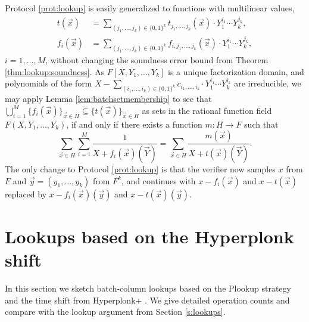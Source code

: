 \documentclass[11pt]{article}
\theoremstyle{definition}
\theoremstyle{definition}
\begin{document}
Protocol \ref{prot:lookup} is easily generalized to functions with multilinear values, 
\begin{align*}
t(\vec x) &= \sum_{(j_1,\ldots, j_k)\in\{0,1\}^k} t_{j_1,\ldots, j_k}(\vec x)\cdot Y_1^{i_1}\cdots Y_k^{j_k},
\\
f_i(\vec x) &= \sum_{(j_1,\ldots, j_k)\in\{0,1\}^k} f_{i, j_1,\ldots, j_k}(\vec x)\cdot Y_1^{i_1}\cdots Y_k^{j_k},
\end{align*}
$i=1,\ldots, M$, without changing the soundness error bound from Theorem \ref{thm:lookup:soundness}.
As $F[X, Y_1,\ldots, Y_k]$ is a unique factorization domain, and polynomials of the form $X -  \sum_{(i_1,\ldots, i_k)\in\{0,1\}^k} c_{i_1,\ldots, i_k}\cdot Y_1^{i_1}\cdots Y_k^{i_k}$ are irreducible, we may apply Lemma \ref{lem:batchsetmembership} to see that $\bigcup_{i=1}^M \{f_i(\vec x)\}_{\vec x\in H}\subseteq \{t(\vec x)\}_{\vec x\in H}$ as sets in the rational function field $F(X, Y_1,\ldots, Y_k)$, if and only if there exists a function $m: H\rightarrow F$ such that
\begin{equation}
\label{e:lookup:fractional:identity:general}
\sum_{\vec x\in H} \sum_{i=1}^M \frac{1}{X + f_i(\vec x)(\vec Y)} = \sum_{\vec x\in H} \frac{m(\vec x)}{X + t(\vec x)(\vec Y)}.
\end{equation}
The only change to Protocol \ref{prot:lookup} is that the verifier now samples $x$ from $F$ and $\vec y = (y_1,\ldots, y_k)$ from $F^k$, and continues with $x - f_i(\vec x)$ and $x - t(\vec x)$ replaced by $x - f_i(\vec x)(\vec y)$ and $x - t(\vec x)(\vec y)$.


\newpage
\section{Lookups based on the Hyperplonk shift}
\label{s:hyperplonk}

In this section we sketch batch-column lookups based on the Plookup strategy and the time shift from Hyperplonk+ \cite{Hyperplonk}. 
We  give detailed operation counts and compare with the lookup argument from Section \ref{s:lookups}.
\end{document}
